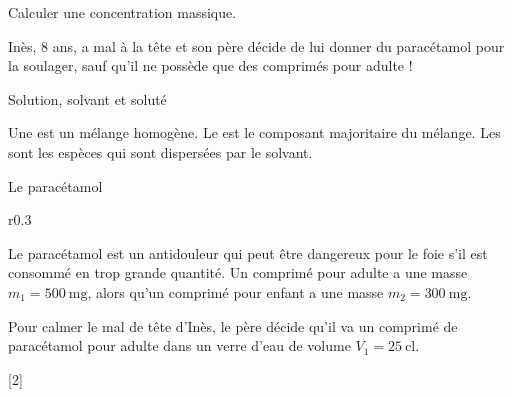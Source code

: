\teteSndSolu

\vspace*{-36pt}

\begin{objectifs}
  \item Calculer une concentration massique.
\end{objectifs}


\begin{contexte}
  Inès, 8 ans, a mal à la tête et son père décide de lui donner du paracétamol pour la soulager, sauf qu'il ne possède que des comprimés pour adulte !

\end{contexte}


\begin{doc}{Solution, solvant et soluté}
  \begin{importants}
    Une  est un mélange homogène.
    Le  est le composant majoritaire du mélange.
    Les  sont les espèces qui sont dispersées par le solvant.
    \begin{center}
    \end{center}
  \end{importants}
\end{doc}

\begin{doc}{Le paracétamol}
  \begin{wrapfigure}[5]{r}{0.3\linewidth}
    \vspace*{-24pt}
    \centering
  \end{wrapfigure}
  
  Le paracétamol est un antidouleur qui peut être dangereux pour le foie s'il est consommé en trop grande quantité.
  Un comprimé pour adulte a une masse $m_1 = \qty{500}{\milli\g}$, alors qu'un comprimé pour enfant a une masse $m_2 = \qty{300}{\milli\g}$.
  
  Pour calmer le mal de tête d'Inès, le père décide qu'il va  un comprimé de paracétamol pour adulte dans un verre d'eau de volume $V_1 = \qty{25}{\centi\litre}$.
\end{doc}


[2]



